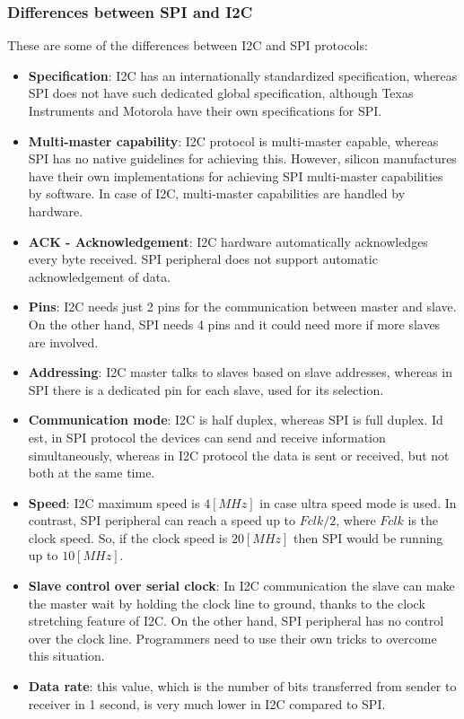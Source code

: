 \subsubsection{Differences between SPI and I2C}
These are some of the differences between I2C and SPI protocols:

\begin{itemize}
	\item	\textbf{Specification}: I2C has an internationally standardized specification, whereas SPI does not have such dedicated global specification, although Texas Instruments and Motorola have their own specifications for SPI.
	\item	\textbf{Multi-master capability}: I2C protocol is multi-master capable, whereas SPI has no native guidelines for achieving this. However, silicon manufactures have their own implementations for achieving SPI multi-master capabilities by software. In case of I2C, multi-master capabilities are handled by hardware.
	\item	\textbf{ACK - Acknowledgement}: I2C hardware automatically acknowledges every byte received. SPI peripheral does not support automatic acknowledgement of data.
	\item	\textbf{Pins}: I2C needs just 2 pins for the communication between master and slave. On the other hand, SPI needs 4 pins and it could need more if more slaves are involved.
	\item	\textbf{Addressing}: I2C master talks to slaves based on slave addresses, whereas in SPI there is a dedicated pin for each slave, used for its selection.
	\item	\textbf{Communication mode}: I2C is half duplex, whereas SPI is full duplex. Id est, in SPI protocol the devices can send and receive information simultaneously, whereas in I2C protocol the data is sent or received, but not both at the same time.
	\item	\textbf{Speed}: I2C maximum speed is $4 [MHz]$ in case ultra speed mode is used. In contrast, SPI peripheral can reach a speed up to $Fclk/2$, where $Fclk$ is the clock speed. So, if the clock speed is $20 [MHz]$ then SPI would be running up to $10 [MHz]$.
	\item	\textbf{Slave control over serial clock}: In I2C communication the slave can make the master wait by holding the clock line to ground, thanks to the clock stretching feature of I2C. On the other hand, SPI peripheral has no control over the clock line. Programmers need to use their own tricks to overcome this situation.
	\item	\textbf{Data rate}: this value, which is the number of bits transferred from sender to receiver in 1 second, is very much lower in I2C compared to SPI.
\end{itemize}

